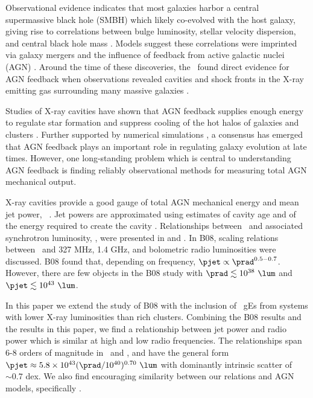 \documentclass{emulateapj}
\begin{document}
Observational evidence indicates that most galaxies harbor a central
supermassive black hole (SMBH) which likely co-evolved with the host
galaxy, giving rise to correlations between bulge luminosity, stellar
velocity dispersion, and central black hole mass
\citep{1995ARA&A..33..581K, magorrian}. Models suggest these
correlations were imprinted via galaxy mergers and the influence of
feedback from active galactic nuclei (AGN)
\citep[\eg][]{1998A&A...331L...1S, 2000MNRAS.311..576K}. Around the
time of these discoveries, the \cxo\ found direct evidence for AGN
feedback when observations revealed cavities and shock fronts in the
X-ray emitting gas surrounding many massive galaxies
\citep[\eg][]{2000ApJ...534L.135M, perseus1,
  2007ApJ...665.1057F}.

Studies of X-ray cavities have shown that AGN feedback supplies enough
energy to regulate star formation and suppress cooling of the hot
halos of galaxies and clusters \citep{birzan04, 2005MNRAS.364.1343D,
  rafferty06}. Further supported by numerical simulations
\citep[\eg][]{croton06, bower06}, a consensus has emerged that AGN
feedback plays an important role in regulating galaxy evolution at
late times. However, one long-standing problem which is central to
understanding AGN feedback is finding reliably observational methods
for measuring total AGN mechanical output.

X-ray cavities provide a good gauge of total AGN mechanical energy and
mean jet power, \pjet\ \citep{2000ApJ...534L.135M}. Jet powers are
approximated using estimates of cavity age and of the energy required
to create the cavity \citep[see][for reviews]{cfreview,
  mcnamrev}. Relationships between \pjet\ and associated synchrotron
luminosity, \prad, were presented in \citet[][hereafter B04]{birzan04}
and \citet[][hereafter B08]{birzan08}. In B08, scaling relations
between \pjet\ and 327 MHz, 1.4 GHz, and bolometric radio luminosities
were discussed. B08 found that, depending on frequency, $\pjet \propto
\prad^{0.5-0.7}$. However, there are few objects in the B08 study with
$\prad \lesssim 10^{38} ~\lum$ and $\pjet \lesssim 10^{43} ~\lum$.

In this paper we extend the study of B08 with the inclusion of
\samp\ gEs from systems with lower X-ray luminosities than rich
clusters. Combining the B08 results and the results in this paper, we
find a relationship between jet power and radio power which is similar
at high and low radio frequencies. The relationships span 6-8 orders
of magnitude in \pjet\ and \prad, and have the general form $\pjet
\approx 5.8 \times 10^{43} (\prad/10^{40})^{0.70} ~\lum$ with
dominantly intrinsic scatter of $\sim 0.7$ dex. We also find
encouraging similarity between our relations and AGN models,
specifically \citet{w99}.
\end{document}
